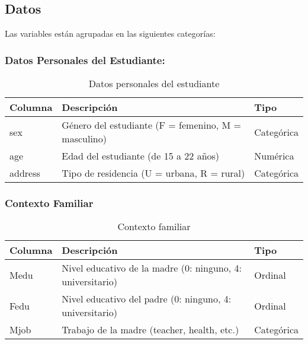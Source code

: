 \documentclass{article}
\begin{document}
\subsection*{Datos}

Las variables están agrupadas en las siguientes categorías:

\subsubsection*{Datos Personales del Estudiante:}

\begin{table}[H]
\centering
\begin{tabular}{|l|p{8cm}|l|}
\hline
\textbf{Columna} & \textbf{Descripción}                                & \textbf{Tipo} \\ \hline
sex              & Género del estudiante (F = femenino, M = masculino) & Categórica    \\ \hline
age              & Edad del estudiante (de 15 a 22 años)               & Numérica      \\ \hline
address          & Tipo de residencia (U = urbana, R = rural)          & Categórica    \\ \hline
\end{tabular}
\caption{Datos personales del estudiante}
\label{tab:datos_personales}
\end{table}

\subsubsection*{Contexto Familiar}

\begin{table}[H]
\centering
\begin{tabular}{|l|p{8cm}|l|}
\hline
\textbf{Columna} & \textbf{Descripción}                                & \textbf{Tipo} \\ \hline
Medu             & Nivel educativo de la madre (0: ninguno, 4: universitario) & Ordinal       \\ \hline
Fedu             & Nivel educativo del padre (0: ninguno, 4: universitario)  & Ordinal       \\ \hline
Mjob             & Trabajo de la madre (teacher, health, etc.)          & Categórica    \\ \hline
\end{tabular}
\caption{Contexto familiar}
\label{tab:contexto_familiar}
\end{table}
\end{document}
